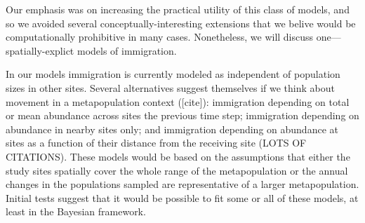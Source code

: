 \documentclass[12pt]{article}
\begin{document}
Our emphasis was on increasing the practical utility of this class of
models, and so we avoided several conceptually-interesting extensions
that we belive would be computationally prohibitive in many
cases. Nonetheless, we will discuss one---spatially-explict models of
immigration.

In our models immigration is currently modeled as independent of
population sizes in other sites. Several alternatives suggest
themselves if we think about movement in a metapopulation
context ([cite]): immigration depending on total or mean
abundance across sites the previous time step; immigration
depending on abundance in nearby sites only; and immigration
depending on abundance at sites as a function of their distance
from the receiving site (LOTS OF CITATIONS). These models would
be based on the assumptions that either the study sites
spatially cover the whole range of the metapopulation or the
annual changes in the populations sampled are representative of
a larger metapopulation. Initial tests suggest that it would be
possible to fit some or all of these models, at least in the
Bayesian framework.

\end{document}
